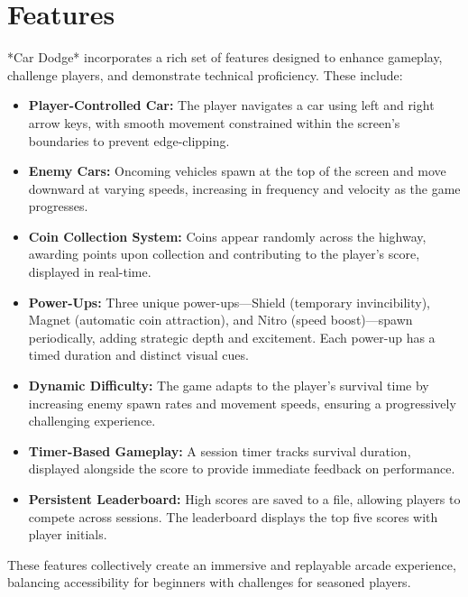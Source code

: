 \documentclass[12pt,a4paper]{article}
\begin{document}
\section{Features}

*Car Dodge* incorporates a rich set of features designed to enhance gameplay, challenge players, and demonstrate technical proficiency. These include: \\

\begin{itemize}
    \item \textbf{Player-Controlled Car:} The player navigates a car using left and right arrow keys, with smooth movement constrained within the screen’s boundaries to prevent edge-clipping. \\
    \item \textbf{Enemy Cars:} Oncoming vehicles spawn at the top of the screen and move downward at varying speeds, increasing in frequency and velocity as the game progresses. \\
    \item \textbf{Coin Collection System:} Coins appear randomly across the highway, awarding points upon collection and contributing to the player’s score, displayed in real-time. \\
    \item \textbf{Power-Ups:} Three unique power-ups—Shield (temporary invincibility), Magnet (automatic coin attraction), and Nitro (speed boost)—spawn periodically, adding strategic depth and excitement. Each power-up has a timed duration and distinct visual cues. \\
    \item \textbf{Dynamic Difficulty:} The game adapts to the player’s survival time by increasing enemy spawn rates and movement speeds, ensuring a progressively challenging experience. \\
    \item \textbf{Timer-Based Gameplay:} A session timer tracks survival duration, displayed alongside the score to provide immediate feedback on performance. \\
    \item \textbf{Persistent Leaderboard:} High scores are saved to a file, allowing players to compete across sessions. The leaderboard displays the top five scores with player initials. \\
\end{itemize}

These features collectively create an immersive and replayable arcade experience, balancing accessibility for beginners with challenges for seasoned players.
\end{document}
